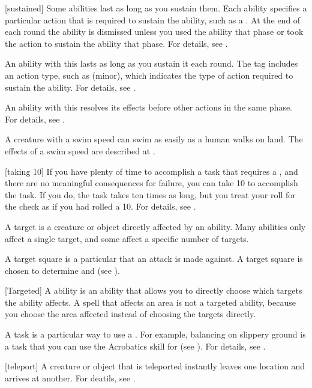 [sustained] Some abilities last as long as you sustain them.
Each ability specifies a particular action that is required to sustain the ability, such as a .
At the end of each round the ability is dismissed unless you used the ability that phase or took the action to sustain the ability that phase.
For details, see .

 An ability with this  lasts as long as you sustain it each round.
The tag includes an action type, such as (minor), which indicates the type of action required to sustain the ability.
For details, see .

 An ability with this  resolves its effects before other actions in the same phase.
For details, see .

 A creature with a swim speed can swim as easily as a human walks on land.
The effects of a swim speed are described at .

[taking 10] If you have plenty of time to accomplish a task that requires a , and there are no meaningful consequences for failure, you can take 10 to accomplish the task.
If you do, the task takes ten times as long, but you treat your roll for the check as if you had rolled a 10.
For details, see .

 A target is a creature or object directly affected by an ability.
Many abilities only affect a single target, and some affect a specific number of targets.

 A target square is a particular  that an attack is made against.
A target square is chosen to determine  and  (see ).

[Targeted] A  ability is an ability that allows you to directly choose which targets the ability affects.
A spell that affects an area is not a targeted ability, because you choose the area affected instead of choosing the targets directly.

 A task is a particular way to use a .
For example, balancing on slippery ground is a task that you can use the Acrobatics skill for (see ).
For details, see .

[teleport] A creature or object that is teleported instantly leaves one location and arrives at another.
For deatils, see .

